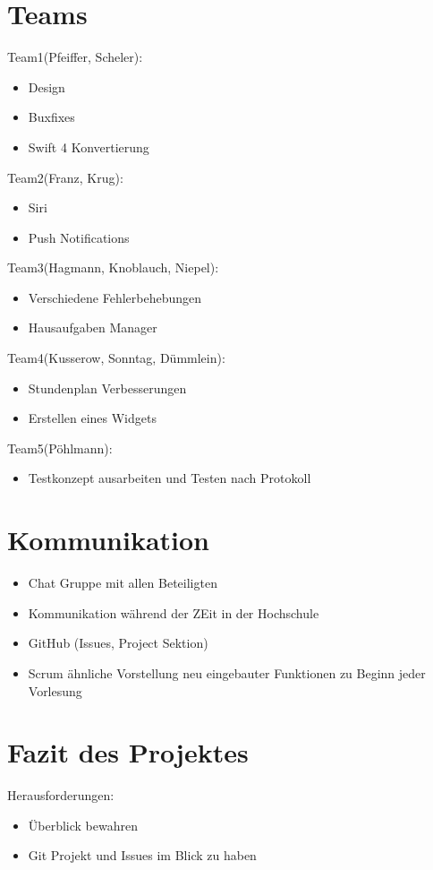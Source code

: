 \section{Teams}

Team1(Pfeiffer, Scheler):
\begin{itemize}
\item Design
\item Buxfixes
\item Swift 4 Konvertierung
\end{itemize}


Team2(Franz, Krug):
\begin{itemize}
\item Siri
\item Push Notifications
\end{itemize}


Team3(Hagmann, Knoblauch, Niepel):
\begin{itemize}
\item Verschiedene Fehlerbehebungen
\item Hausaufgaben Manager
\end{itemize}


Team4(Kusserow, Sonntag, Dümmlein):
\begin{itemize}
\item Stundenplan Verbesserungen
\item Erstellen eines Widgets
\end{itemize}


Team5(Pöhlmann):
\begin{itemize}
\item Testkonzept ausarbeiten und Testen nach Protokoll
\end{itemize}


\section{Kommunikation}
\begin{itemize}
\item Chat Gruppe mit allen Beteiligten
\item Kommunikation während der ZEit in der Hochschule
\item GitHub (Issues, Project Sektion)
\item Scrum ähnliche Vorstellung neu eingebauter Funktionen zu Beginn jeder Vorlesung
\end{itemize}


\section{Fazit des Projektes}
Herausforderungen:
\begin{itemize}
\item Überblick bewahren
\item Git Projekt und Issues im Blick zu haben
\end{itemize}


